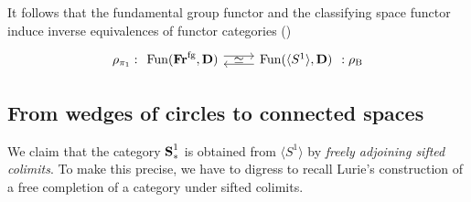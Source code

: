 \documentclass[psamsfonts]{amsart}
\theoremstyle{plain}
\theoremstyle{definition}
\theoremstyle{remark}
\newcommand{\catname}[1]{{\normalfont\textbf{#1}}}
\newcommand{\circles}{\langle S^1 \rangle}
\newcommand{\spaces}{\catname{S}_*}
\newcommand{\connected}{\spaces^{1}}
\newcommand{\fr}{\allfr^{\mathrm{fg}}}
\newcommand{\allfr}{\catname{Fr}}
\newcommand{\classifying}{\operatorname{B}}
\DeclareMathOperator{\fun}{Fun}
\begin{document}
It follows that the fundamental group functor and the classifying space functor induce inverse equivalences of functor categories (\cite[Proposition 1.2.7.3 (3)]{LurieHTT})
\begin{equation}\label{eq: functor equivalence}
\rho_{\pi_1} : \begin{tikzcd}
           \fun(\fr, \catname{D})
           \arrow[r, shift left=.75ex]
            \arrow[r, phantom, "\simeq"] 
           & \fun(\circles, \catname{D})
           \arrow[l, shift left=.75ex]      
        \end{tikzcd}  : \rho_{\classifying}
\end{equation}
\subsection{From wedges of circles to connected spaces} We claim that the category $\connected$ is obtained from $\circles$ by {\it freely adjoining sifted colimits}. To make this precise, we have to digress to recall Lurie's construction of a free completion of a category under sifted colimits.
\end{document}
